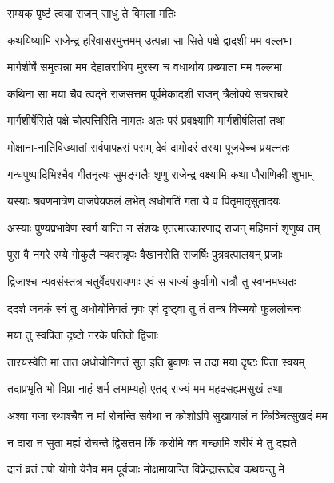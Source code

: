 \onelineshloka
{सम्यक् पृष्टं त्वया राजन् साधु ते विमला मतिः} %

\twolineshloka
{कथयिष्यामि राजेन्द्र हरिवासरमुत्तमम्}
{उत्पन्ना सा सिते पक्षे द्वादशी मम वल्लभा} %

\twolineshloka
{मार्गशीर्षे समुत्पन्ना मम देहान्नराधिप}
{मुरस्य च वधार्थाय प्रख्याता मम वल्लभा} %

\twolineshloka
{कथिना सा मया चैव त्वद्ने राजसत्तम}
{पूर्वमेकादशी राजन् त्रैलोक्ये सचराचरे} %

\twolineshloka
{मार्गशीर्षेसिते पक्षे चोत्पत्तिरिति नामतः}
{अतः परं प्रवक्ष्यामि मार्गशीर्षलितां तथा} %

\twolineshloka
{मोक्षाना-नातिविख्यातां सर्वपापहरां पराम्}
{देवं दामोदरं तस्या पूजयेच्च प्रयत्नतः} %

\twolineshloka
{गन्धपुष्पादिभिश्चैव गीतनृत्यः सुमङ्गलैः}
{शृणु राजेन्द्र वक्ष्यामि कथा पौराणिकी शुभाम्} %

\twolineshloka
{यस्याः श्रवणमात्रेण वाजपेयफलं लभेत्}
{अधोगतिं गता ये व पितृमातृसुतादयः} %

\twolineshloka
{अस्याः पुण्यप्रभावेण स्वर्ग यान्ति न संशयः}
{एतत्मात्कारणाद् राजन् महिमानं शृणुष्व तम्} %

\twolineshloka
{पुरा वै नगरे रम्ये गोकुलै न्यवसन्नृपः}
{वैखानसेति राजर्षिः पुत्रवत्पालयन् प्रजाः} %

\twolineshloka
{द्विजाश्च न्यवसंस्तत्र चतुर्वेदपरायणाः}
{एवं स राज्यं कुर्वाणो रात्रौ तु स्वप्नमध्यतः} %

\twolineshloka
{ददर्श जनकं स्वं तु अधोयोनिगतं नृपः}
{एवं दृष्ट्वा तु तं तन्त्र विस्मयो फुललोचनः} %



\onelineshloka
{मया तु स्वपिता दृष्टो नरके पतितो द्विजाः} %

\twolineshloka
{तारयस्वेति मां तात अधोयोनिगतं सुत}
{इति ब्रुवाणः स तदा मया दृष्टः पिता स्वयम्} %

\twolineshloka
{तदाप्रभृति भो विप्रा नाहं शर्म लभाम्यहो}
{एतद् राज्यं मम महदसह्यमसुखं तथा} %

\twolineshloka
{अश्वा गजा रथाश्चैव न मां रोचन्ति सर्वथा}
{न कोशोऽपि सुखायालं न किञ्चित्सुखदं मम} %

\twolineshloka
{न दारा न सुता मह्यं रोचन्ते द्विसत्तम}
{किं करोमि क्व गच्छामि शरीरं मे तु दह्यते} %

\twolineshloka
{दानं व्रतं तपो योगो येनैव मम पूर्वजाः}
{मोक्षमायान्ति विप्रेन्द्रास्तदेव कथयन्तु मे} %

